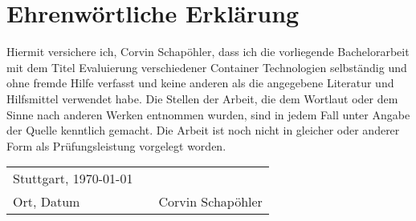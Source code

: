 \chapter{Ehrenwörtliche Erklärung}
\thispagestyle{front}
Hiermit versichere ich, Corvin Schapöhler, dass ich die vorliegende Bachelorarbeit mit dem Titel Evaluierung verschiedener Container Technologien selbständig und ohne fremde Hilfe verfasst und keine anderen als die angegebene Literatur und Hilfsmittel verwendet habe. Die Stellen der Arbeit, die dem Wortlaut oder dem Sinne nach anderen Werken entnommen wurden, sind in jedem Fall unter Angabe der Quelle kenntlich gemacht. Die Arbeit ist noch nicht in gleicher oder anderer Form als Prüfungsleistung vorgelegt worden.
\vspace{2cm}

\begin{center}
	\begin{tabular}[h]{lp{2cm}p{5.5cm}}
		Stuttgart, \today & & \\
		\cline{1-1}\cline{3-3}
		Ort, Datum& & Corvin Schapöhler\\
	\end{tabular}
\end{center}

